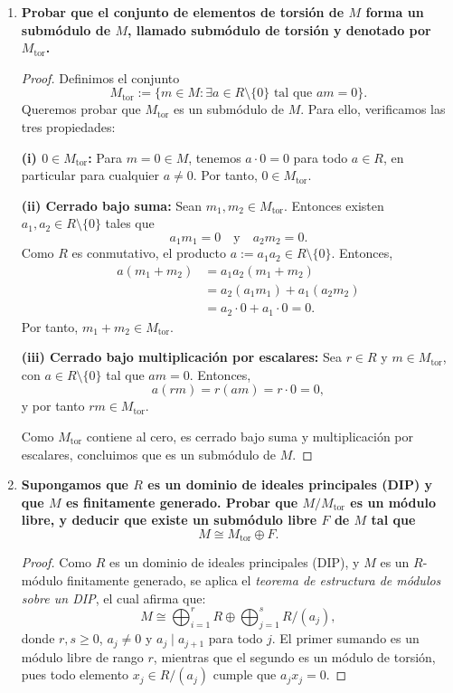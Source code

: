	\begin{enumerate}
		\item \textbf{Probar que el conjunto de elementos de torsión de $M$ forma un submódulo de $M$, llamado submódulo de torsión y denotado por $M_{\text{tor}}$.}
		
		\begin{proof}
			Definimos el conjunto
			\[
			M_{\text{tor}} := \{ m \in M : \exists a \in R \setminus \{0\} \text{ tal que } am = 0 \}.
			\]
			Queremos probar que $M_{\text{tor}}$ es un submódulo de $M$. Para ello, verificamos las tres propiedades:
			
			\textbf{(i) $0 \in M_{\text{tor}}$:} Para $m = 0 \in M$, tenemos $a \cdot 0 = 0$ para todo $a \in R$, en particular para cualquier $a \neq 0$. Por tanto, $0 \in M_{\text{tor}}$.
			
			\textbf{(ii) Cerrado bajo suma:} Sean $m_1, m_2 \in M_{\text{tor}}$. Entonces existen $a_1, a_2 \in R \setminus \{0\}$ tales que
			\[
			a_1 m_1 = 0 \quad \text{y} \quad a_2 m_2 = 0.
			\]
			Como $R$ es conmutativo, el producto $a := a_1 a_2 \in R \setminus \{0\}$. Entonces,
			\begin{align*}
				a(m_1 + m_2) &= a_1 a_2 (m_1 + m_2) \\
				&= a_2 (a_1 m_1) + a_1 (a_2 m_2) \\
				&= a_2 \cdot 0 + a_1 \cdot 0 = 0.
			\end{align*}
			Por tanto, $m_1 + m_2 \in M_{\text{tor}}$.
			
			\textbf{(iii) Cerrado bajo multiplicación por escalares:} Sea $r \in R$ y $m \in M_{\text{tor}}$, con $a \in R \setminus \{0\}$ tal que $am = 0$. Entonces,
			\[
			a(rm) = r(am) = r \cdot 0 = 0,
			\]
			y por tanto $rm \in M_{\text{tor}}$.
			
			Como $M_{\text{tor}}$ contiene al cero, es cerrado bajo suma y multiplicación por escalares, concluimos que es un submódulo de $M$.
		\end{proof}
		
		\item \textbf{Supongamos que $R$ es un dominio de ideales principales (DIP) y que $M$ es finitamente generado. Probar que $M/M_{\text{tor}}$ es un módulo libre, y deducir que existe un submódulo libre $F$ de $M$ tal que}
		\[
		M \cong M_{\text{tor}} \oplus F.
		\]
		
	\begin{proof}
		Como $R$ es un dominio de ideales principales (DIP), y $M$ es un $R$-módulo finitamente generado, se aplica el \emph{teorema de estructura de módulos sobre un DIP}, el cual afirma que:
		\[
		M \cong \bigoplus_{i=1}^r R \oplus \bigoplus_{j=1}^s R/(a_j),
		\]
		donde $r, s \geq 0$, $a_j \neq 0$ y $a_j \mid a_{j+1}$ para todo $j$. El primer sumando es un módulo libre de rango $r$, mientras que el segundo es un módulo de torsión, pues todo elemento $x_j \in R/(a_j)$ cumple que $a_j x_j = 0$.
		

\end{proof}
\end{enumerate}
